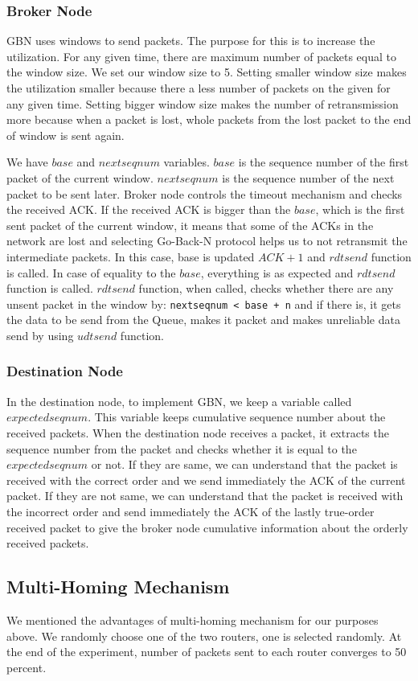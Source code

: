 \documentclass[conference]{IEEEtran}
\begin{document}
\subsubsection{Broker Node}
GBN uses windows to send packets. The purpose for this is to increase the utilization. For any given time, there are maximum number of packets equal to the window size. We set our window size to 5. Setting smaller window size makes the utilization smaller because there a less number of packets on the given for any given time. Setting bigger window size makes the number of retransmission more because when a packet is lost, whole packets from the lost packet to the end of window is sent again.
\par We have $base$ and $nextseqnum$ variables. $base$ is the sequence number of the first packet of the current window. $nextseqnum$ is the sequence number of the next packet to be sent later. Broker node controls the timeout mechanism and checks the received ACK. If the received ACK is bigger than the $base$, which is the first sent packet of the current window, it means that some of the ACKs in the network are lost and selecting Go-Back-N protocol helps us to not retransmit the intermediate packets. In this case, base is updated $ACK+1$ and $rdtsend$ function is called. In case of equality to the $base$, everything is as expected and $rdtsend$ function is called.  $rdtsend$ function, when called, checks whether there are any unsent packet in the window by: \texttt{nextseqnum < base + n} and if there is, it gets the data to be send from the Queue, makes it packet and makes unreliable data send by using $udtsend$ function.
\subsubsection{Destination Node}
In the destination node, to implement GBN, we keep a variable called $expectedseqnum$. This variable keeps cumulative sequence number about the received packets. When the destination node receives a packet, it extracts the sequence number from the packet and checks whether it is equal to the  $expectedseqnum$ or not. If they are same, we can understand that the packet is received with the correct order and we send immediately the ACK of the current packet. If they are not same, we can understand that the packet is received with the incorrect order and send immediately the ACK of the lastly true-order received packet to give the broker node cumulative information about the orderly received packets. 
\subsection{Multi-Homing Mechanism}
We mentioned the advantages of multi-homing mechanism for our purposes above. We randomly choose one of the two routers, one is selected randomly. At the end of the experiment, number of packets sent to each router converges to 50 percent. 
\end{document}
